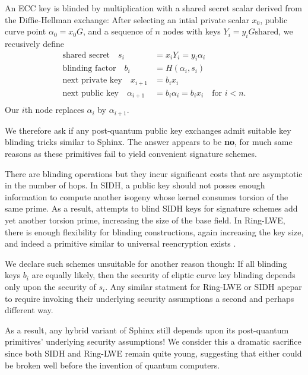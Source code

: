 \documentclass[twoside,letterpaper]{sig-alternate}
\def\mathcomma{,}
\def\mathcomma{}
\begin{document}
An ECC key is blinded by multiplication with a shared secret scalar
derived from the Diffie-Hellman exchange:
After selecting an intial private scalar $x_0$,
 public curve point $\alpha_0 = x_0 G$, and 
 a sequence of $n$ nodes with keys $Y_i = y_i G \textrm{shared}$,
we recusively define 
\[ \begin{aligned}
\textrm{shared secret}\quad
 s_i &= x_i Y_i = y_i \alpha_i \mathcomma \\
\textrm{blinding factor}\quad
 b_i &= H(\alpha_i,s_i) \mathcomma \\
\textrm{next private key}\quad
 x_{i+1} &= b_i x_i \mathcomma \\ %
\textrm{next public key}\quad
 \alpha_{i+1} &= b_i \alpha_i = b_i x_i \quad\textrm{for $i < n$.} \\
\end{aligned} \]
Our $i$th node replaces $\alpha_i$ by $\alpha_{i+1}$.

\smallskip

We therefore ask if any post-quantum public key exchanges admit 
suitable key blinding tricks similar to Sphinx. 
The answer appears to be {\bf no}, for much same reasons as 
these primitives fail to yield convenient signature schemes. 

There are blinding operations but they  incur significant costs 
that are asymptotic in the number of hops.
%
In SIDH, a public key should not posses enough information to compute
another isogeny whose kernel consumes torsion of the same prime. 
As a result, attempts to blind SIDH keys for signature schemes add
yet another torsion prime, increasing the size of the base field.
%
In Ring-LWE, there is enough flexibility for blinding constructions,
again increasing the key size, and indeed a primitive similar to
universal reencryption exists \cite{963628}.

We declare such schemes unsuitable for another reason though: 
%
If all blinding keys $b_i$ are equally likely, then the security of
eliptic curve key blinding depends only upon the security of $s_i$.
%
Any similar statment for Ring-LWE or SIDH apepar to require invoking
their underlying security assumptions a second and perhaps different way. 

As a result, any hybrid variant of Sphinx still depends upon its
post-quantum primitives' underlying security assumptions! 
%
We consider this a dramatic sacrifice since both SIDH and Ring-LWE
remain quite young, suggesting that either could be broken well
 before the invention of quantum computers.
\end{document}
